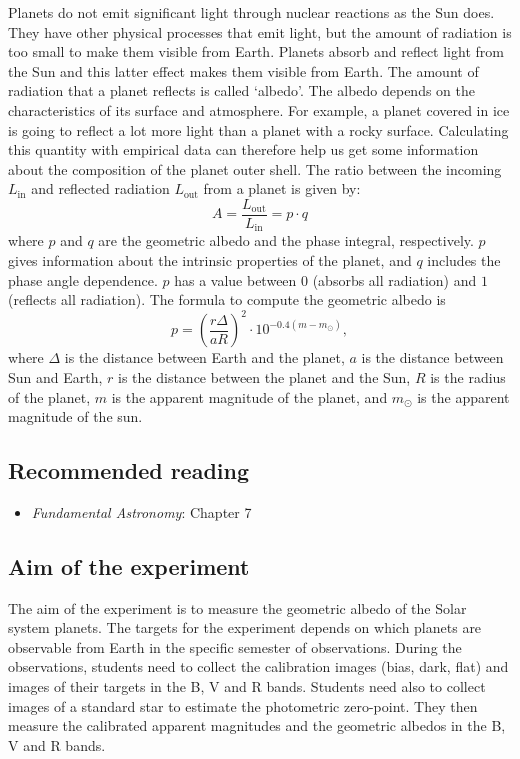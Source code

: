 \documentclass[a4paper, 11pt, fleqn]{memoir}
\begin{document}
Planets do not emit significant light through nuclear reactions as the Sun does.
They have other physical processes that emit light, but the amount of radiation is too small to make them visible from Earth.
Planets absorb and reflect light from the Sun and this latter effect makes them visible from Earth.
The amount of radiation that a planet reflects is called `albedo'.
The albedo depends on the characteristics of its surface and atmosphere.
For example, a planet covered in ice is going to reflect a lot more light than a planet with a rocky surface.
Calculating this quantity with empirical data can therefore help us get some information about the composition of the planet outer shell.
The ratio between the incoming $L_\text{in}$ and reflected radiation $L_\mathrm{out}$ from a planet is given by:
\begin{equation}
    A = \frac{L_\text{out}}{L_\text{in}} = p \cdot q
\end{equation}
where
$p$ and $q$ are the geometric albedo and the phase integral, respectively.
$p$ gives information about the intrinsic properties of the planet, and
$q$ includes the phase angle dependence.
$p$ has a value between $0$ (absorbs all radiation) and $1$ (reflects all radiation).
The formula to compute the geometric albedo is
\begin{equation}
    p = \left ( \frac{r \Delta}{a R} \right)^2 \cdot 10^{-0.4(m - m_{\odot})},
\end{equation}
where $\Delta$ is the distance between Earth and the planet,
$a$ is the distance between Sun and Earth,
$r$ is the distance between the planet and the Sun,
$R$ is the radius of the planet,
$m$ is the apparent magnitude of the planet,
and $m_{\odot}$ is the apparent magnitude of the sun.

\subsection{Recommended reading}
\begin{itemize}
    \item \emph{Fundamental Astronomy}\autocite{Karttunen2016FundamentalAstronomy}: Chapter 7
\end{itemize}

\subsection{Aim of the experiment}

The aim of the experiment is to measure the geometric albedo of the Solar system planets.
The targets for the experiment depends on which planets are observable from Earth in the specific semester of observations.
During the observations, students need to collect the calibration images (bias, dark, flat) and images of their targets in the B, V and R bands.
Students need also to collect images of a standard star to estimate the photometric zero-point.
They then measure the calibrated apparent magnitudes and the geometric albedos in the B, V and R bands.
\end{document}
